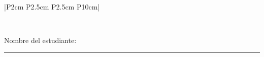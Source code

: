 \documentclass[12pt]{article}
\begin{document}
\begin{table}[h!]
\begin{tabular}{|P{2cm} P{2.5cm} P{2.5cm} P{10cm}|}
 \\ \hline


 \\ \hline


\end{tabular}
\end{table}

\vspace{1cm}

\noindent Nombre del estudiante: \rule{8cm}{0.4pt} \\[0.5cm]
\end{document}
